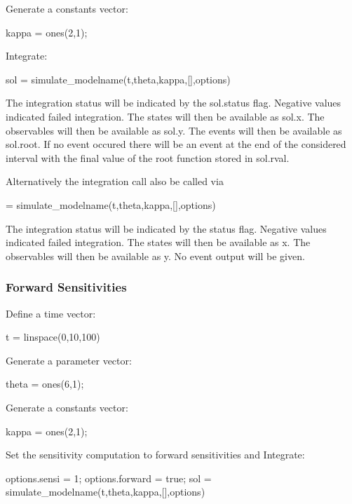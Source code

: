 Generate a constants vector\+:


\begin{DoxyCode}
kappa = ones(2,1);
\end{DoxyCode}


Integrate\+:


\begin{DoxyCode}
sol = simulate\_modelname(t,theta,kappa,[],options)
\end{DoxyCode}


The integration status will be indicated by the sol.\+status flag. Negative values indicated failed integration. The states will then be available as sol.\+x. The observables will then be available as sol.\+y. The events will then be available as sol.\+root. If no event occured there will be an event at the end of the considered interval with the final value of the root function stored in sol.\+rval.

Alternatively the integration call also be called via


\begin{DoxyCode}
[status,t,x,y] = simulate\_modelname(t,theta,kappa,[],options)
\end{DoxyCode}


The integration status will be indicated by the status flag. Negative values indicated failed integration. The states will then be available as x. The observables will then be available as y. No event output will be given.\hypertarget{def_simu_forward}{}\subsubsection{Forward Sensitivities}\label{def_simu_forward}
Define a time vector\+:


\begin{DoxyCode}
t = linspace(0,10,100)
\end{DoxyCode}


Generate a parameter vector\+:


\begin{DoxyCode}
theta = ones(6,1);
\end{DoxyCode}


Generate a constants vector\+:


\begin{DoxyCode}
kappa = ones(2,1);
\end{DoxyCode}


Set the sensitivity computation to forward sensitivities and Integrate\+:


\begin{DoxyCode}
options.sensi = 1;
options.forward = \textcolor{keyword}{true};
sol = simulate\_modelname(t,theta,kappa,[],options)
\end{DoxyCode}


